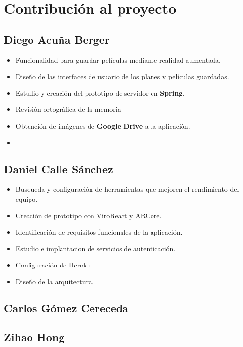 
\cleardoublepage


\chapter{Contribución al proyecto}
\label{makereference7}

\section{Diego Acuña Berger}
\label{makereference7.1}
\begin{itemize}
    \item Funcionalidad para guardar películas mediante realidad aumentada.
    \item Diseño de las interfaces de usuario de los planes y películas guardadas.  
    \item Estudio y creación del prototipo de servidor en \textbf{Spring}.
    \item Revisión ortográfica de la memoria.
    \item Obtención de imágenes de \textbf{Google Drive} a la aplicación.
    \item 
\end{itemize}
\section{Daniel Calle Sánchez}
\label{makereference7.2}
\begin{itemize}  
    \item Busqueda y configuración de herramientas que mejoren el rendimiento del equipo.
    \item Creación de prototipo con ViroReact y ARCore.
    \item Identificación de requisitos funcionales de la aplicación.
    \item Estudio e implantacion de servicios de autenticación.
    \item Configuración de Heroku.
    \item Diseño de la arquitectura.
\end{itemize}

\section{Carlos Gómez Cereceda}
\label{makereference7.3}

\section{Zihao Hong}
\label{makereference7.4}
